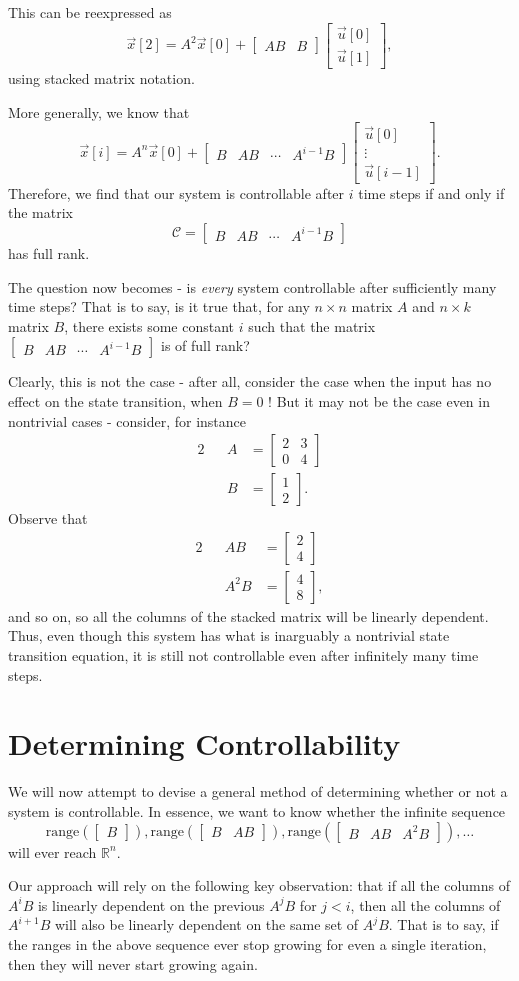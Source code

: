 \documentclass[letterpaper]{article}
\theoremstyle{remark}
\newcommand{\mat}[1]{\ensuremath{\begin{bmatrix}#1\end{bmatrix}}}
\newcommand{\eqn}[1]{\begin{alignat*}{2}#1\end{alignat*}}
\begin{document}
This can be reexpressed as
\[
    \vec{x}[2] = A^2\vec{x}[0] + \mat{AB & B} \mat{\vec{u}[0] \\ \vec{u}[1]},
\]
using stacked matrix notation.

More generally, we know that
\[
    \vec{x}[i] = A^n\vec{x}[0] + \mat{B & AB & \cdots & A^{i - 1}B} \mat{\vec{u}[0] \\ \vdots \\ \vec{u}[i - 1]}.
\]
Therefore, we find that our system is controllable after $i$ time steps if and only if the matrix
\[
    \mathscr{C} = \mat{B & AB & \cdots & A^{i - 1}B}
\]
has full rank.

The question now becomes - is \emph{every} system controllable after sufficiently many time steps? That is to say, is it true that, for any $n\times n$ matrix $A$ and $n\times k$ matrix $B$, there exists some constant $i$ such that the matrix $\mat{B & AB & \cdots & A^{i - 1}B}$ is of full rank?

Clearly, this is not the case - after all, consider the case when the input has no effect on the state transition, when $B = 0$ ! But it may not be the case even in nontrivial cases - consider, for instance
\eqn{
    && A &= \mat{2 & 3 \\ 0 & 4} \\
    && B &= \mat{1 \\ 2}.
}
Observe that
\eqn{
    && AB &= \mat{2 \\ 4} \\
    && A^2B &= \mat{4 \\ 8},
}
and so on, so all the columns of the stacked matrix will be linearly dependent. Thus, even though this system has what is inarguably a nontrivial state transition equation, it is still not controllable even after infinitely many time steps.

\section{Determining Controllability}
We will now attempt to devise a general method of determining whether or not a system is controllable. In essence, we want to know whether the infinite sequence
\[
    \text{range}(\mat{B}), \text{range}(\mat{ B & AB}), \text{range}(\mat{B & AB & A^2B}), \ldots
\]
will ever reach $\mathbb{R}^n$.

Our approach will rely on the following key observation: that if all the columns of $A^iB$ is linearly dependent on the previous $A^jB$ for $j < i$, then all the columns of $A^{i+1}B$ will also be linearly dependent on the same set of $A^jB$. That is to say, if the ranges in the above sequence ever stop growing for even a single iteration, then they will never start growing again.
\end{document}
